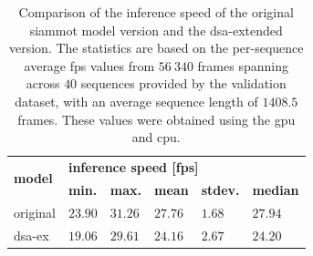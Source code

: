 \begin{table}[!t]
    \centering
    \begin{tabular}{llllll}
        \toprule
        \multirow{2}{*}{\textbf{model}} & \multicolumn{5}{l}{\textbf{inference speed [\gls{fps}]}}                                                                     \\
                                        & \textbf{min.}                                            & \textbf{max.} & \textbf{mean} & \textbf{stdev.} & \textbf{median} \\
        \midrule
        original                        & $23.90$                                                  & $31.26$       & $27.76$       & $1.68$          & $27.94$         \\
        \gls{dsa}-ex                    & $19.06$                                                  & $29.61$       & $24.16$       & $2.67$          & $24.20$         \\
        \bottomrule
    \end{tabular}
    \caption[\gls{dsa} extension inference time comparison]{Comparison of the inference speed of the original \gls{siammot} model version and the \gls{dsa}-extended version. The statistics are based on the per-sequence average \gls{fps} values from $56\ 340$ frames spanning across $40$ sequences provided by the \uadetrac{} validation dataset, with an average sequence length of $1408.5$ frames. These values were obtained using the \usedgpu{} \gls{gpu} and \usedcpu{} \gls{cpu}.}
    \label{tab:InferenceSpeedComparison}
\end{table}